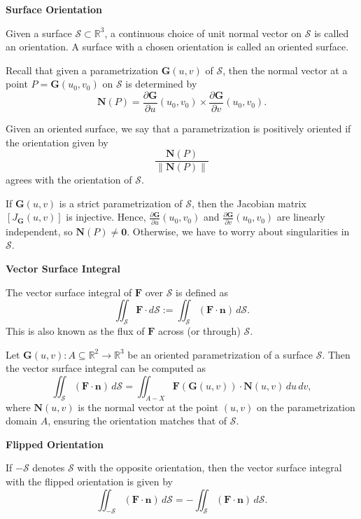 \documentclass{article}
\newcommand{\R}{\mathbb{R}}
\newenvironment{definition}[1]{
    \par\noindent\textbf{#1}\par\noindent
}{
    \par \vspace{0.5cm}
}
\begin{document}
\begin{definition}{Surface Orientation}
Given a surface \( \mathcal{S} \subset \R^3 \), a continuous choice of unit normal vector on \( \mathcal{S} \) is called an orientation. A surface with a chosen orientation is called an oriented surface.

Recall that given a parametrization \( \bm{G}(u, v) \) of \( \mathcal{S} \), then the normal vector at a point \( P = \bm{G}(u_0, v_0) \) on \( \mathcal{S} \) is determined by
\[ \bm{N}(P) = \frac{\partial \bm{G}}{\partial u}(u_0, v_0) \times \frac{\partial \bm{G}}{\partial v}(u_0, v_0). \]

Given an oriented surface, we say that a parametrization is positively oriented if the orientation given by
\[ \frac{\bm{N}(P)}{\|\bm{N}(P)\|} \]
agrees with the orientation of \( \mathcal{S} \).

If \( \bm{G}(u, v) \) is a strict parametrization of \( \mathcal{S} \), then the Jacobian matrix \( [J_{\bm{G}}(u, v)] \) is injective. Hence, \( \frac{\partial \bm{G}}{\partial u}(u_0, v_0) \) and \( \frac{\partial \bm{G}}{\partial v}(u_0, v_0) \) are linearly independent, so \( \bm{N}(P) \neq \bm{0} \). Otherwise, we have to worry about singularities in \( \mathcal{S} \).
\end{definition}

\begin{definition}{Vector Surface Integral}
The vector surface integral of \(\bm{F}\) over \(\mathcal{S}\) is defined as
\[ \iint_{\mathcal{S}} \bm{F} \cdot d\mathcal{S} := \iint_{\mathcal{S}} (\bm{F} \cdot \bm{n}) \, d\mathcal{S}. \]
This is also known as the flux of \(\bm{F}\) across (or through) \(\mathcal{S}\).

Let \(\bm{G}(u, v) : A \subseteq \R^2 \rightarrow \R^3\) be an oriented parametrization of a surface \(\mathcal{S}\). Then the vector surface integral can be computed as
\[ \iint_{\mathcal{S}} (\bm{F} \cdot \bm{n}) \, d\mathcal{S} = \iint_{A-X} \bm{F} (\bm{G}(u, v)) \cdot \bm{N}(u, v) \, du \, dv, \]
where \(\bm{N}(u, v)\) is the normal vector at the point \((u, v)\) on the parametrization domain \(A\), ensuring the orientation matches that of \(\mathcal{S}\).
\end{definition}

\begin{definition}{Flipped Orientation}
If \(-\mathcal{S}\) denotes \(\mathcal{S}\) with the opposite orientation, then the vector surface integral with the flipped orientation is given by
\[ \iint_{-\mathcal{S}} (\bm{F} \cdot \bm{n}) \, d\mathcal{S} = -\iint_{\mathcal{S}} (\bm{F} \cdot \bm{n}) \, d\mathcal{S}. \]
\end{definition}
\end{document}
